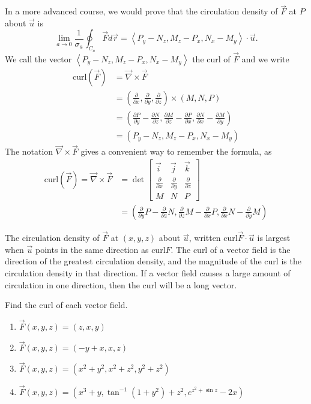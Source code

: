 In a more advanced course, we would prove that the circulation density of $\vec F$ at $P$ about $\vec u$ is 
$$\lim_{a\to 0} \frac{1}{\sigma_a}\oint_{C_a} \vec F d\vec r = \left<P_y-N_z, M_z-P_x, N_x-M_y\right>\cdot \vec u.$$ 
We call the vector $\left<P_y-N_z,M_z-P_x,N_x-M_y\right>$ the curl of $\vec F$ and we write 
\begin{align*}
\text{curl}(\vec F) 
&= \vec \nabla \times \vec F \\
&= \left(\frac{\partial}{\partial x},\frac{\partial}{\partial y},\frac{\partial}{\partial z}\right) \times (M,N,P) \\
&= \left(\frac{\partial P}{\partial y}-\frac{\partial N}{\partial z}, \frac{\partial M}{\partial z}-\frac{\partial P}{\partial x},\frac{\partial N}{\partial x}-\frac{\partial M}{\partial y}\right) \\
&=  \left(P_y-N_z,M_z-P_x,N_x-M_y\right) 
\end{align*}
  The notation $\vec \nabla \times \vec F $ gives a convenient way to remember the formula, as 
\begin{align*}
\text{curl}(\vec F)=\vec \nabla \times \vec F 
&=\det \begin{bmatrix}
\vec i & \vec j & \vec k\\
\frac{\partial}{\partial x}&\frac{\partial}{\partial y}&\frac{\partial}{\partial z}\\
M&N&P
\end{bmatrix} 
\\&= \left(\frac{\partial}{\partial y}P-\frac{\partial}{\partial z}N,\frac{\partial}{\partial z}M-\frac{\partial}{\partial x}P,\frac{\partial}{\partial x}N-\frac{\partial}{\partial y}M\right)
\end{align*}
\begin{theorem}
The circulation density of $\vec F$ at $(x,y,z)$ about $\vec u$, written $\text{curl}\vec F\cdot \vec u$ is largest when $\vec u$ points in the same direction as $\text{curl} F$. The curl of a vector field is the direction of the greatest circulation density, and the magnitude of the curl is the circulation density in that direction. If a vector field causes a large amount of circulation in one direction, then the curl will be a long vector.
\end{theorem}

\begin{problem}
Find the curl of each vector field. 
\begin{enumerate}
 \item $\vec F(x,y,z) = \left(z,x,y \right)$
 \item $\vec F(x,y,z) = \left(-y+x,x,z \right)$
 \item $\vec F(x,y,z) = \left(x^2+y^2,x^2+z^2,y^2+z^2 \right)$
 \item $\vec F(x,y,z) = \left(x^3+y,\tan^{-1}(1+y^2) + z^2,e^{z^2+\sin z} -2x\right)$
\end{enumerate}
\end{problem}

